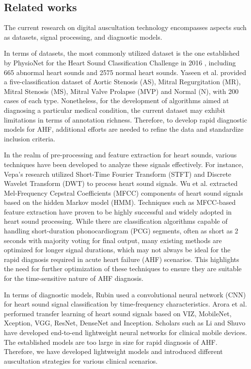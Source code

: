 \subsection{Related works}
The current research on digital auscultation technology encompasses aspects such as datasets, signal processing, and diagnostic models.

In terms of datasets, the most commonly utilized dataset is the one established by PhysioNet for the Heart Sound Classification Challenge in 2016 \cite{clifford2016classification}, including 665 abnormal heart sounds and 2575 normal heart sounds. Yaseen et al. \cite{son2018classification} provided a five-classification dataset of Aortic Stenosis (AS), Mitral Regurgitation (MR), Mitral Stenosis (MS), Mitral Valve Prolapse (MVP) and Normal (N), with 200 cases of each type. Nonetheless, for the development of algorithms aimed at diagnosing a particular medical condition, the current dataset may exhibit limitations in terms of annotation richness. Therefore, to develop rapid diagnostic models for AHF, additional efforts are needed to refine the data and standardize inclusion criteria.

In the realm of pre-processing and feature extraction for heart sounds, various techniques have been developed to analyze these signals effectively. For instance, Vepa's research \cite{vepa2009classification} utilized Short-Time Fourier Transform (STFT) and Discrete Wavelet Transform (DWT) to process heart sound signals. Wu et al. \cite{wu2010hidden} extracted Mel-Frequency Cepstral Coefficients (MFCC) components of heart sound signals based on the hidden Markov model (HMM). Techniques such as MFCC-based feature extraction have proven to be highly successful and widely adopted in heart sound processing. While there are classification algorithms capable of handling short-duration phonocardiogram (PCG) segments, often as short as 2 seconds with majority voting for final output, many existing methods are optimized for longer signal durations, which may not always be ideal for the rapid diagnosis required in acute heart failure (AHF) scenarios. This highlights the need for further optimization of these techniques to ensure they are suitable for the time-sensitive nature of AHF diagnosis.

In terms of diagnostic models, Rubin \cite{rubin2016classifying} used a convolutional neural network (CNN) for heart sound signal classification by time-frequency characteristics. Arora et al. \cite{arora2021transfer} performed transfer learning of heart sound signals based on VIZ, MobileNet, Xception, VGG, ResNet, DenseNet and Inception. Scholars such as Li and Shuvo \cite{li2021lightweight,shuvo2021cardioxnet} have developed end-to-end lightweight neural networks for clinical mobile devices. The established models are too large in size for rapid diagnosis of AHF. Therefore, we have developed lightweight models and introduced different auscultation strategies for various clinical scenarios.

